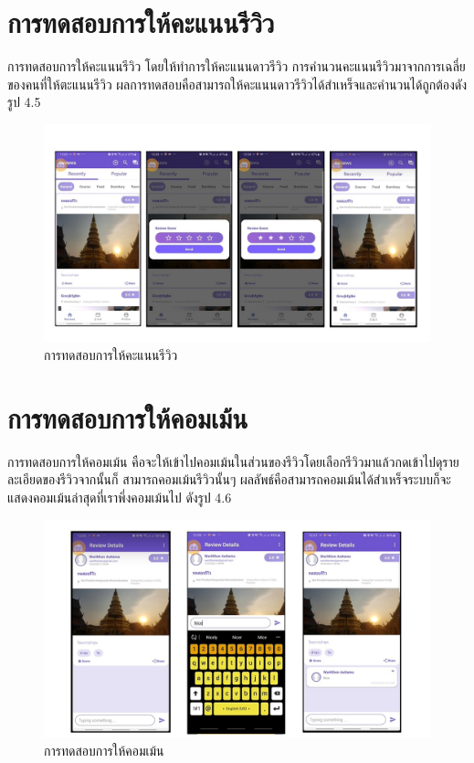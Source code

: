 \section{การทดสอบการให้คะแนนรีวิว}
\quad \quad การทดสอบการให้คะแนนรีวิว โดยให้ทำการให้คะแนนดาวรีวิว การคำนวนคะแนนรีวิวมาจากการเฉลี่ยของคนที่ให้ตะแนนรีวิว
ผลการทดสอบคือสามารถให้คะแนนดาวรีวิวได้สำเหร็จและคำนวนได้ถูกต้องดังรูป 4.5
\begin{figure}
    \begin{center}
      \includegraphics[width=1\textwidth]{./image/testing/Slide6.JPG}
    \end{center}
    \caption[การทดสอบการให้คะแนนรีวิว]{การทดสอบการให้คะแนนรีวิว}
    \end{figure}

\section{การทดสอบการให้คอมเม้น}
\quad \quad การทดสอบการให้คอมเม้น คือจะให้เข้าไปคอมเม้นในส่วนของรีวิวโดยเลือกรีวิวมาแล้วกดเข้าไปดุรายละเอียดของรีวิวจากนั้นก็
สามารถคอมเม้นรีวิวนั้นๆ ผลลัพธ์คือสามารถคอมเม้นได้สำเหร็จระบบก็จะแสดงคอมเม้นล่าสุดที่เราพึ่งคอมเม้นไป ดังรูป 4.6 

\begin{figure}
    \begin{center}
      \includegraphics[width=1\textwidth]{./image/testing/Slide7.JPG}
    \end{center}
    \caption[การทดสอบการให้คอมเม้น]{การทดสอบการให้คอมเม้น}
    \end{figure}

